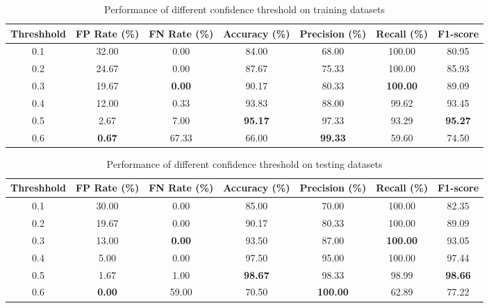 \documentclass{article}[12pt]
\begin{document}
\begin{table}[H]
    \centering
    \caption{Performance of different confidence threshold on training datasets}
    \begin{tabular}{@{}ccccccc@{}}
    \toprule
    Threshhold & FP Rate (\%)  & FN Rate (\%)  & Accuracy (\%)  & Precision (\%) & Recall (\%)     & F1-score       \\ \midrule
    0.1 & 32.00 & 0.00 & 84.00 & 68.00 & 100.00 & 80.95 \\
    0.2 & 24.67 & 0.00 & 87.67 & 75.33 & 100.00 & 85.93 \\
    0.3        & 19.67         & \textbf{0.00} & 90.17          & 80.33          & \textbf{100.00} & 89.09          \\
    0.4        & 12.00         & 0.33          & 93.83          & 88.00          & 99.62           & 93.45          \\
    0.5        & 2.67          & 7.00          & \textbf{95.17} & 97.33          & 93.29           & \textbf{95.27} \\
    0.6        & \textbf{0.67} & 67.33         & 66.00          & \textbf{99.33} & 59.60           & 74.50          \\ \bottomrule
    \end{tabular}
    \label{tab: yolo_train}
\end{table}

\begin{table}[H]
    \centering
    \caption{Performance of different confidence threshold on testing datasets}
    \begin{tabular}{@{}ccccccc@{}}
    \toprule
    Threshhold & FP Rate (\%)  & FN Rate (\%)  & Accuracy (\%)  & Precision (\%)  & Recall (\%)     & F1-score       \\ \midrule
    0.1 & 30.00 & 0.00 & 85.00 & 70.00 & 100.00 & 82.35 \\
    0.2 & 19.67 & 0.00 & 90.17 & 80.33 & 100.00 & 89.09 \\
    0.3        & 13.00         & \textbf{0.00} & 93.50          & 87.00           & \textbf{100.00} & 93.05          \\
    0.4        & 5.00          & 0.00          & 97.50          & 95.00           & 100.00          & 97.44          \\
    0.5        & 1.67          & 1.00          & \textbf{98.67} & 98.33           & 98.99           & \textbf{98.66} \\
    0.6        & \textbf{0.00} & 59.00         & 70.50          & \textbf{100.00} & 62.89           & 77.22          \\ \bottomrule
    \end{tabular}
    \label{tab: yolo_test}
\end{table}
\end{document}
